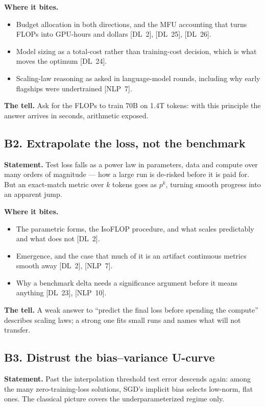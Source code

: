 \textbf{Where it bites.}
\begin{itemize}[itemsep=1pt,topsep=2pt,leftmargin=1.3em]
\item Budget allocation in both directions, and the MFU accounting that turns FLOPs into GPU-hours and dollars [DL~2], [DL~25], [DL~26].
\item Model sizing as a total-cost rather than training-cost decision, which is what moves the optimum [DL~24].
\item Scaling-law reasoning as asked in language-model rounds, including why early flagships were undertrained [NLP~7].
\end{itemize}

\textbf{The tell.} Ask for the FLOPs to train 70B on 1.4T tokens: with this principle the answer arrives in seconds, arithmetic exposed.

\subsection*{B2. Extrapolate the loss, not the benchmark}

\textbf{Statement.} Test loss falls as a power law in parameters, data and compute over many orders of magnitude --- how a large run is de-risked before it is paid for. But an exact-match metric over $k$ tokens goes as $p^k$, turning smooth progress into an apparent jump.

\textbf{Where it bites.}
\begin{itemize}[itemsep=1pt,topsep=2pt,leftmargin=1.3em]
\item The parametric forms, the IsoFLOP procedure, and what scales predictably and what does not [DL~2].
\item Emergence, and the case that much of it is an artifact continuous metrics smooth away [DL~2], [NLP~7].
\item Why a benchmark delta needs a significance argument before it means anything [DL~23], [NLP~10].
\end{itemize}

\textbf{The tell.} A weak answer to ``predict the final loss before spending the compute'' describes scaling laws; a strong one fits small runs and names what will not transfer.

\subsection*{B3. Distrust the bias--variance U-curve}

\textbf{Statement.} Past the interpolation threshold test error descends again: among the many zero-training-loss solutions, SGD's implicit bias selects low-norm, flat ones. The classical picture covers the underparameterized regime only.


